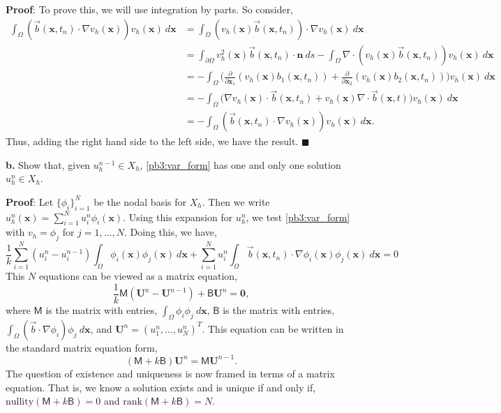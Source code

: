 \documentclass[11pt]{article}
\newcommand{\bs}{\boldsymbol}
\begin{document}
\textbf{Proof}: To prove this, we will use integration by parts.
So consider,
\begin{align*}
    \int_\Omega (\Vec{b}(\bs{x}, t_n) \cdot \nabla v_h(\bs{x})) v_h(\bs{x}) \: d\bs{x} &= \int_\Omega (v_h(\bs{x}) \Vec{b}(\bs{x}, t_n)) \cdot \nabla v_h(\bs{x}) \: d\bs{x} \\
    &= \int_{\partial \Omega} v_h^2(\bs{x}) \Vec{b}(\bs{x},t_n) \cdot \mathbf{n} \: ds - \int_\Omega \nabla \cdot (v_h(\bs{x}) \Vec{b}(\bs{x},t_n)) v_h(\bs{x}) \: d\bs{x} \\
    &= -\int_\Omega \big( \frac{\partial}{\partial \bs{x}_1}(v_h(\bs{x}) b_1(\bs{x},t_n)) + \frac{\partial}{\partial \bs{x}_2}(v_h(\bs{x})b_2(\bs{x},t_n)) \big) v_h(\bs{x}) \: d\bs{x} \\
	&= - \int_\Omega \big( \nabla v_h(\bs{x}) \cdot \Vec{b}(\bs{x},t_n) + v_h(\bs{x}) \nabla \cdot \Vec{b}(\bs{x},t) \big) v_h(\bs{x}) \: d\bs{x} \\
    &= -\int_\Omega (\Vec{b}(\bs{x}, t_n) \cdot \nabla v_h(\bs{x})) v_h(\bs{x}) \: d\bs{x}.
\end{align*}
Thus, adding the right hand side to the left side, we have the result.
$\blacksquare$

\vskip 2cm


\textbf{b.}  Show that, given $u^{n-1}_h \in X_h$, \eqref{pb3:var_form} has one and only one solution $u^n_h \in X_h$.


\vskip 1cm


\textbf{Proof}: Let $\{\phi_i\}_{i=1}^N$ be the nodal basis for $X_h$.
Then we write $u^n_h(\bs{x}) = \sum_{i=1}^N u_i^n \phi_i(\bs{x})$.
Using this expansion for $u^n_h$, we test \eqref{pb3:var_form} with $v_h = \phi_j$ for $j = 1,\ldots, N$.
Doing this, we have,
\begin{equation}
	\frac1k \sum_{i=1}^N (u^n_i - u^{n-1}_i) \int_\Omega \phi_i(\bs{x}) \phi_j(\bs{x}) \: d\bs{x} + \sum_{i=1}^N u^n_i \int_\Omega \vec{b}(\bs{x}, t_n) \cdot \nabla \phi_i(\bs{x}) \phi_j(\bs{x}) \: d\bs{x} = 0
\end{equation}
This $N$ equations can be viewed as a matrix equation,
\begin{equation}
	\frac1k \mathsf{M} (\mathbf{U}^n - \mathbf{U}^{n-1}) + \mathsf{B} \mathbf{U}^n = \mathbf{0},
\end{equation}
where $\mathsf{M}$ is the matrix with entries, $\int_\Omega \phi_i \phi_j \: d\bs{x}$, $\mathsf{B}$ is the matrix with entries, $\int_\Omega (\vec{b} \cdot \nabla \phi_i) \phi_j \: d\bs{x}$, and $\mathbf{U}^n = (u_1^n, \ldots, u_N^n)^T$.
This equation can be written in the standard matrix equation form,
\begin{equation}
	(\mathsf{M} + k\mathsf{B}) \mathbf{U}^n = \mathsf{M}\mathbf{U}^{n-1}.
\end{equation}
The question of existence and uniqueness is now framed in terms of a matrix equation.
That is, we know a solution exists and is unique if and only if, $\text{nullity}(\mathsf{M} + k\mathsf{B}) = 0$ and $\text{rank}(\mathsf{M} + k\mathsf{B}) = N$.
\end{document}
